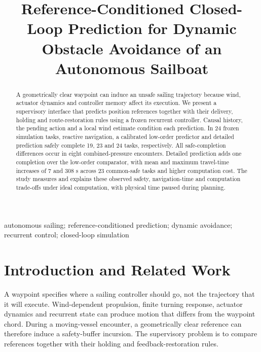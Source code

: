 \documentclass[conference]{IEEEtran}
\begin{document}
\title{Reference-Conditioned Closed-Loop Prediction for Dynamic Obstacle Avoidance of an Autonomous Sailboat}

\author{}
\maketitle

\begin{abstract}
A geometrically clear waypoint can induce an unsafe sailing trajectory because wind, actuator dynamics and controller memory affect its execution. We present a supervisory interface that predicts position references together with their delivery, holding and route-restoration rules using a frozen recurrent controller. Causal history, the pending action and a local wind estimate condition each prediction. In 24 frozen simulation tasks, reactive navigation, a calibrated low-order predictor and detailed prediction safely complete 19, 23 and 24 tasks, respectively. All safe-completion differences occur in eight combined-pressure encounters. Detailed prediction adds one completion over the low-order comparator, with mean and maximum travel-time increases of 7 and 308 s across 23 common-safe tasks and higher computation cost. The study measures and explains these observed safety, navigation-time and computation trade-offs under ideal computation, with physical time paused during planning.
\end{abstract}

\begin{IEEEkeywords}autonomous sailing; reference-conditioned prediction; dynamic avoidance; recurrent control; closed-loop simulation\end{IEEEkeywords}

\section{Introduction and Related Work}

A waypoint specifies where a sailing controller should go, not the trajectory that it will execute. Wind-dependent propulsion, finite turning response, actuator dynamics and recurrent state can produce motion that differs from the waypoint chord. During a moving-vessel encounter, a geometrically clear reference can therefore induce a safety-buffer incursion. The supervisory problem is to compare references together with their holding and feedback-restoration rules.
\end{document}
